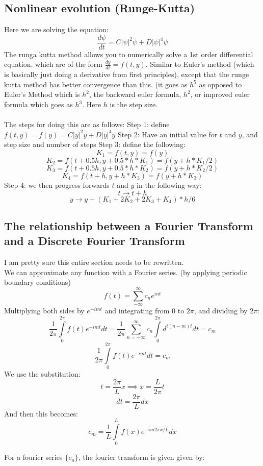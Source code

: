 \documentclass[a4paper,12pt]{report}
\begin{document}
\subsection{Nonlinear evolution (Runge-Kutta)}
Here we are solving the equation:
$$\frac{d\psi}{dt}=C|\psi|^2\psi + D|\psi|^4\psi$$
The runga kutta method allows you to numerically solve a 1st order differential equation. which are of the form $\frac{dy}{dt}=f(t,y)$. Similar to Euler's method (which is basically just doing a derivative from first principles), except that the runge kutta method has better convergence than this. (it goes as $h^5$ as opposed to Euler's Method which is $h^2$, the backward euler formula, $h^2$, or improved euler formula which goes as $h^3$. Here $h$ is the step size. 
\\\\
The steps for doing this are as follows:
Step 1: define $f(t,y)=f(y)=C|y|^2 y  +D|y|^4 y$
Step 2: Have an initial value for $t$ and $y$, and step size and number of steps
Step 3: define the following:
$$K_1 =f(t,y)=f(y)$$
$$K_2 =f(t+0.5h,y+0.5*h*K_1)=f(y+h*K_1/2)$$
$$K_3 =f(t+0.5h,y+0.5*h*K_2)=f(y+h*K_2/2)$$
$$K_4 =f(t+h,y+h*K_3)=f(y+h*K_3)$$
Step 4: we then progress forwards $t$ and $y$ in the following way:
$$t\rightarrow t+h$$
$$y\rightarrow y+(K_1+2K_2+2K_3+K_4)*h/6$$






\iffalse
\subsection{The relationship between a Fourier Transform and a Discrete Fourier Transform}
I am pretty sure this entire section needs to be rewritten.\\
We can approximate any function with a Fourier series. (by applying periodic boundary conditions)\\
$$f(t)=\sum\limits_{-\infty}^{\infty} c_n e^{i n t}$$
Multiplying both sides by $e^{-i m t}$ and integrating from 0 to $2\pi$, and dividing by $2\pi$:
$$\frac{1}{2\pi} \int\limits_{0}^{2\pi} f(t)e^{-i m t}dt = \frac{1}{2\pi} \sum \limits_{n=-\infty}^{\infty} c_n \int\limits_{0}^{2\pi} d^{i (n-m) t} dt= c_m$$
$$\frac{1}{2\pi} \int\limits_{0}^{2\pi} f(t)e^{-i m t}dt =c_m$$
We use the substitution:
$$t = \frac{2\pi}{L}  x \implies x = \frac{L}{2\pi} t$$
$$dt = \frac{2\pi}{L}  dx$$
And then this becomes:
$$c_m = \frac{1}{L} \int\limits_{0}^{L} f(x) e^{-i m 2\pi x/L} dx $$

For a fourier series $\{c_n\}$, the fourier transform is given given by:
\end{document}
